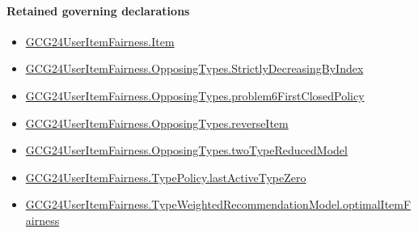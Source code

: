 \documentclass[10pt]{article}
\begin{document}
\paragraph{Retained governing declarations}
\begin{itemize}\raggedright
\item \hyperlink{governing-declaration-a7c560a429c6e204}{GCG24\allowbreak{}User\allowbreak{}Item\allowbreak{}Fairness.\allowbreak{}Item}
\item \hyperlink{governing-declaration-8278344d2ddef9a8}{GCG24\allowbreak{}User\allowbreak{}Item\allowbreak{}Fairness.\allowbreak{}Opposing\allowbreak{}Types.\allowbreak{}Strictly\allowbreak{}Decreasing\allowbreak{}By\allowbreak{}Index}
\item \hyperlink{governing-declaration-c9eb0ce285dbfd64}{GCG24\allowbreak{}User\allowbreak{}Item\allowbreak{}Fairness.\allowbreak{}Opposing\allowbreak{}Types.\allowbreak{}problem6\allowbreak{}First\allowbreak{}Closed\allowbreak{}Policy}
\item \hyperlink{governing-declaration-c12a8e29d370ae70}{GCG24\allowbreak{}User\allowbreak{}Item\allowbreak{}Fairness.\allowbreak{}Opposing\allowbreak{}Types.\allowbreak{}reverse\allowbreak{}Item}
\item \hyperlink{governing-declaration-b87168913e966e7f}{GCG24\allowbreak{}User\allowbreak{}Item\allowbreak{}Fairness.\allowbreak{}Opposing\allowbreak{}Types.\allowbreak{}two\allowbreak{}Type\allowbreak{}Reduced\allowbreak{}Model}
\item \hyperlink{governing-declaration-8a85b9f21510683a}{GCG24\allowbreak{}User\allowbreak{}Item\allowbreak{}Fairness.\allowbreak{}Type\allowbreak{}Policy.\allowbreak{}last\allowbreak{}Active\allowbreak{}Type\allowbreak{}Zero}
\item \hyperlink{governing-declaration-fc7d3f75e1b48fb3}{GCG24\allowbreak{}User\allowbreak{}Item\allowbreak{}Fairness.\allowbreak{}Type\allowbreak{}Weighted\allowbreak{}Recommendation\allowbreak{}Model.\allowbreak{}optimal\allowbreak{}Item\allowbreak{}Fairness}
\end{itemize}
\end{document}
